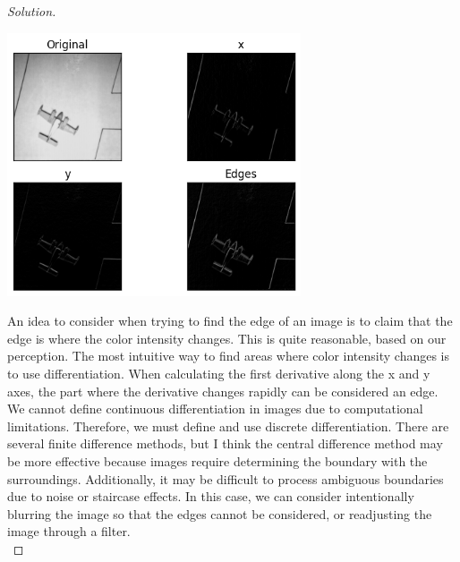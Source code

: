 \begin{proof} [Solution]
\begin{center}
			\includegraphics[width=0.65\textwidth]{airplane.png}
		\end{center}
		An idea to consider when trying to find the edge of an image is to claim that the edge is where the color intensity changes. This is quite reasonable, based on our perception. The most intuitive way to find areas where color intensity changes is to use differentiation. When calculating the first derivative along the x and y axes, the part where the derivative changes rapidly can be considered an edge.\\
		We cannot define continuous differentiation in images due to computational limitations. Therefore, we must define and use discrete differentiation. There are several finite difference methods, but I think the central difference method may be more effective because images require determining the boundary with the surroundings. Additionally, it may be difficult to process ambiguous boundaries due to noise or staircase effects. In this case, we can consider intentionally blurring the image so that the edges cannot be considered, or readjusting the image through a filter.\\
	\end{proof}